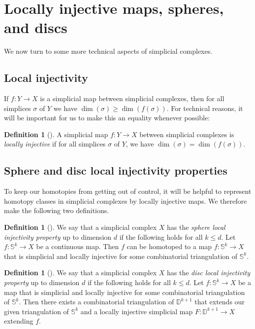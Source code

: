 \documentclass[11pt]{amsart}
\numberwithin{equation}{section}
\theoremstyle{plain}
\theoremstyle{definition}
\newtheorem{defn}[theorem]{Definition}
\newenvironment{definition}[1][]{\begin{defn}[#1]\pushQED{\qed}}{\popQED \end{defn}}
\theoremstyle{remark}
\newcommand\bbD{\ensuremath{\mathbb{D}}}
\newcommand\bbS{\ensuremath{\mathbb{S}}}
\begin{document}
\section{Locally injective maps, spheres, and discs}
\label{section:localinj}

We now turn to some more technical aspects of simplicial complexes.

\subsection{Local injectivity}
If $f\colon Y \rightarrow X$ is a simplicial map between simplicial complexes, then for all
simplices $\sigma$ of $Y$ we have $\dim(\sigma) \geq \dim(f(\sigma))$.  For technical reasons,
it will be important for us to make this an equality whenever possible:

\begin{definition}
A simplicial map $f\colon Y \rightarrow X$ between simplicial complexes is {\em locally injective}
if for all simplices $\sigma$ of $Y$, we have $\dim(\sigma) = \dim(f(\sigma))$.
\end{definition}

\subsection{Sphere and disc local injectivity properties}
To keep our homotopies from getting out of control, it will be helpful to represent
homotopy classes in simplicial complexes by locally injective maps.  We therefore
make the following two definitions.

\begin{definition}
\label{definition:spherelocalinj}
We say that a simplicial complex $X$ has the {\em sphere local injectivity property} up to
dimension $d$ if the following holds for all $k \leq d$.  Let $f\colon \bbS^k \rightarrow X$
be a continuous map.  Then $f$ can be homotoped to a map $f\colon \bbS^k \rightarrow X$ that
is simplicial and locally injective for some combinatorial triangulation of $\bbS^k$.
\end{definition}

\begin{definition}
\label{definition:disclocalinj}
We say that a simplicial complex $X$ has the {\em disc local injectivity property} up to
dimension $d$ if the following holds for all $k \leq d$.  Let $f\colon \bbS^k \rightarrow X$
be a map that is simplicial and locally injective for some combinatorial triangulation
of $\bbS^k$.  Then there exists a combinatorial triangulation of $\bbD^{k+1}$ that extends
our given triangulation of $\bbS^k$ and a locally injective simplicial map $F\colon \bbD^{k+1} \rightarrow X$
extending $f$.
\end{definition}
\end{document}
